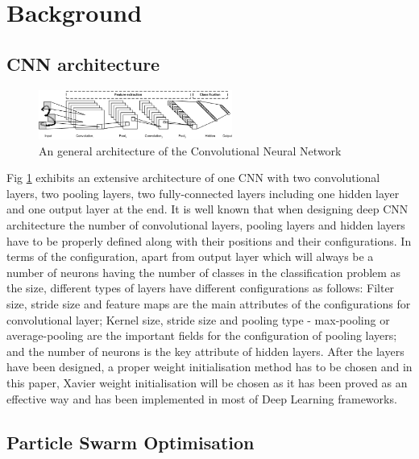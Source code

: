 \documentclass[conference]{IEEEtran}
\begin{document}
\section{Background}\label{sec:Background}

\subsection{CNN architecture}\label{sec:CNNArchitecture}

\begin{figure}[!t]
	\centering
	\includegraphics[width=2.5in]{cnn_architecture}
	\caption{An general architecture of the Convolutional Neural Network}
	\label{fig:CNNArchitecture}
\end{figure}

Fig \ref{fig:CNNArchitecture} exhibits an extensive architecture of one CNN with two convolutional layers, two pooling layers, two fully-connected layers including one hidden layer and one output layer at the end. It is well known that when designing deep CNN architecture the number of convolutional layers, pooling layers and hidden layers have to be properly defined along with their positions and their configurations. In terms of the configuration, apart from output layer which will always be a number of neurons having the number of classes in the classification problem as the size, different types of layers have different configurations as follows: Filter size, stride size and feature maps are the main attributes of the configurations for convolutional layer; Kernel size, stride size and pooling type - max-pooling or average-pooling are the important fields for the configuration of pooling layers; and the number of neurons is the key attribute of hidden layers. After the layers have been designed, a proper weight initialisation method has to be chosen and in this paper, Xavier weight initialisation \cite{WeightIniti:Glorot} will be chosen as it has been proved as an effective way and has been implemented in most of Deep Learning frameworks.

\subsection{Particle Swarm Optimisation}
\end{document}

